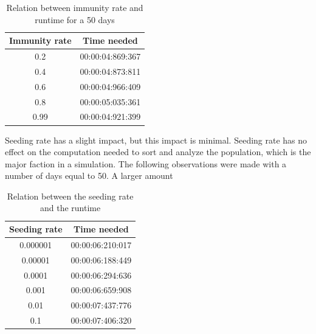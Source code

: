 \documentclass[runningheads]{llncs}
\begin{document}
	\begin{table}
		\caption{Relation between immunity rate and runtime for a 50 days}
		\begin{center}
			\begin{tabular}{ | c | c |}
				\hline
				Immunity rate & Time needed \\ \hline
				0.2 & 00:00:04:869:367 \\ \hline
				0.4 & 00:00:04:873:811 \\ \hline
				0.6 & 00:00:04:966:409 \\ \hline
				0.8 & 00:00:05:035:361 \\ \hline
				0.99 & 00:00:04:921:399 \\
				\hline	
			\end{tabular}
		\end{center}
	\end{table}
	
	\noindent
	Seeding rate has a slight impact, but this impact is minimal. Seeding rate has no effect on the computation needed to sort and analyze the population, which is the major faction in a simulation. The following observations were made with a number of days equal to 50. A larger amount 
	\begin{table}
		\caption{Relation between the seeding rate and the runtime}
		\begin{center}
			\begin{tabular}{ | c | c |}
				\hline
				Seeding rate & Time needed \\ \hline
				0.000001 & 00:00:06:210:017 \\ \hline
				0.00001 & 00:00:06:188:449 \\ \hline
				0.0001 & 00:00:06:294:636 \\ \hline
				0.001 & 00:00:06:659:908 \\ \hline
				0.01 & 00:00:07:437:776 \\ \hline
				0.1 & 00:00:07:406:320 \\
				\hline	
			\end{tabular}
		\end{center} 
	\end{table} 
	\noindent
	
\end{document}
